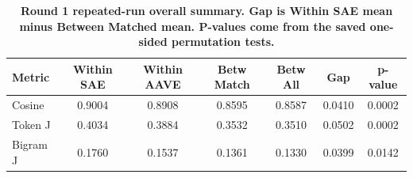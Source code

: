 \begin{table}[htbp]
\centering
\caption{\textbf{Round 1 repeated-run overall summary. Gap is Within SAE mean minus Between Matched mean. P-values come from the saved one-sided permutation tests.}}
\label{tab:round1-repeated-summary}
\renewcommand{\arraystretch}{1.4}
\begin{tabular}{|l|c|c|c|c|c|c|}
\hline
\textbf{Metric} & \textbf{Within SAE} & \textbf{Within AAVE} & \textbf{Betw Match} & \textbf{Betw All} & \textbf{Gap} & \textbf{p-value} \\
\hline
Cosine & 0.9004 & 0.8908 & 0.8595 & 0.8587 & 0.0410 & 0.0002 \\
\hline
Token J & 0.4034 & 0.3884 & 0.3532 & 0.3510 & 0.0502 & 0.0002 \\
\hline
Bigram J & 0.1760 & 0.1537 & 0.1361 & 0.1330 & 0.0399 & 0.0142 \\
\hline
\end{tabular}
\end{table}

